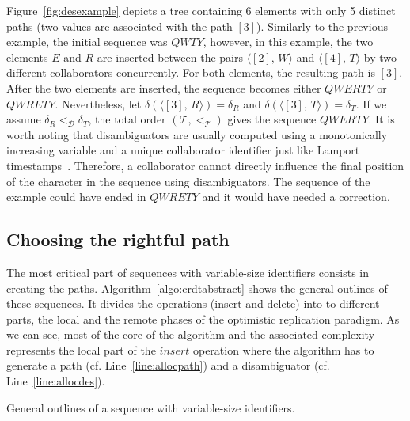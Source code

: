 Figure~\ref{fig:desexample} depicts a tree containing 6 elements with only 5
distinct paths (two values are associated with the path $[3]$). Similarly to
the previous example, the initial sequence was $QWTY$, however, in this
example, the two elements $E$ and $R$ are inserted between the pairs
$\langle [2],\, W\rangle$ and $\langle [4],\,T\rangle$ by two different
collaborators concurrently. For both elements, the resulting path is
$[3]$. After the two elements are inserted, the sequence becomes either
$QWERTY$ or $QWRETY$. Nevertheless, let
$\delta(\langle [3],\, R \rangle) = \delta_R$ and
$\delta(\langle [3],\, T\rangle) = \delta_T$. If we assume
$\delta_R <_\mathcal{D} \delta_T$, the total order
$(\mathcal{T}, <_\mathcal{T})$ gives the sequence $QWERTY$. It is worth noting
that disambiguators are usually computed using a monotonically increasing
variable and a unique collaborator identifier just like Lamport
timestamps~\cite{lamport1978time}. Therefore, a collaborator cannot directly
influence the final position of the character in the sequence using
disambiguators. The sequence of the example could have ended in $QWRETY$ and it
would have needed a correction.

\subsection{Choosing the rightful path}
\label{subsec:choosing}

The most critical part of sequences with variable-size identifiers consists in
creating the paths. Algorithm~\ref{algo:crdtabstract} shows the general
outlines of these sequences. It divides the operations (insert and delete) into
to different parts, the local and the remote phases of the optimistic
replication paradigm. As we can see, most of the core of the algorithm and the
associated complexity represents the local part of the $insert$ operation where
the algorithm has to generate a path (cf. Line~\ref{line:allocpath}) and a
disambiguator (cf. Line~\ref{line:allocdes}).

\begin{algorithm}[h]
  
  \caption{\label{algo:crdtabstract}General outlines of a sequence with
    variable-size identifiers.}
\end{algorithm}


